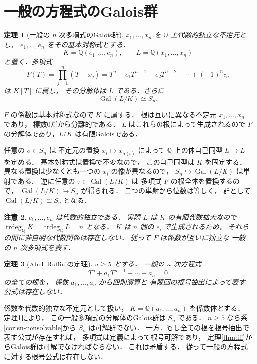 \documentclass[a5paper,10pt,onecolumn]{jsarticle}
\makeatletter
\theoremstyle{mathnotetheorem}
\newtheorem{theorem}{定理}[section]
\newtheorem{remark}[theorem]{注意}
\renewcommand{\proofname}{証明}
\renewenvironment{proof}[1][\proofname]{%
  \par\pushQED{\qed}\normalfont\topsep4\p@\@plus2\p@\relax
  \trivlist\item[\hskip\labelsep\bfseries #1]\ignorespaces
}{\popQED\endtrivlist\@endpefalse}
\makeatother
\begin{document}
\section{一般の方程式のGalois群}

\begin{theorem}[一般の $n$ 次多項式のGalois群]\label{thm:generic}
$x_1,\dots,x_n$ を $\mathbb Q$ 上代数的独立な不定元とし，
$e_1,\dots,e_n$ をその基本対称式とする．
\[
 K=\mathbb Q(e_1,\dots,e_n),\qquad
 L=\mathbb Q(x_1,\dots,x_n)
\]
と置く．多項式
\[
 F(T)=\prod_{j=1}^n(T-x_j)
 =T^n-e_1T^{n-1}+e_2T^{n-2}
 -\cdots+(-1)^ne_n
\]
は $K[T]$ に属し，
その分解体は $L$ である．さらに
\[
 \operatorname{Gal}(L/K)\cong S_n.
\]
\end{theorem}
\begin{proof}
$F$ の係数は基本対称式なので $K$ に属する．
根は互いに異なる不定元 $x_1,\dots,x_n$ であり，
標数0だから分離的である．
$L$ はこれらの根によって生成されるので
$F$ の分解体であり，$L/K$ は有限Galoisである．

任意の $\sigma\in S_n$ は
不定元の置換
$x_i\mapsto x_{\sigma(i)}$ によって
$\mathbb Q$ 上の体自己同型 $L\to L$ を定める．
基本対称式は置換で不変なので，
この自己同型は $K$ を固定する．
異なる置換は少なくとも一つの $x_i$ の像が異なるので，
$S_n\hookrightarrow\operatorname{Gal}(L/K)$ は単射である．
逆に任意の $\tau\in\operatorname{Gal}(L/K)$ は
多項式 $F$ の根全体を置換するので，
$\operatorname{Gal}(L/K)\hookrightarrow S_n$ が得られる．
二つの単射から位数は等しく，
群として $\operatorname{Gal}(L/K)\cong S_n$ となる．
\end{proof}

\begin{remark}
$e_1,\dots,e_n$ は代数的独立である．
実際 $L$ は $K$ の有限代数拡大なので
$\operatorname{trdeg}_{\mathbb Q}K
=\operatorname{trdeg}_{\mathbb Q}L=n$ となる．
$K$ は $n$ 個の $e_i$ で生成されるため，
それらの間に非自明な代数関係は存在しない．
従って $F$ は係数が互いに独立な
\emph{一般の $n$ 次多項式}を表す．
\end{remark}

\begin{theorem}[Abel--Ruffiniの定理]\label{thm:abel-ruffini}
$n\ge5$ とする．
一般の $n$ 次方程式
\[
 T^n+a_1T^{n-1}+\cdots+a_n=0
\]
の全ての根を，
係数 $a_1,\dots,a_n$ から四則演算と
有限回の根号抽出によって表す公式は存在しない．
\end{theorem}
\begin{proof}
係数を代数的独立な不定元として扱い，
$K=\mathbb Q(a_1,\dots,a_n)$ を係数体とする．
定理\ref{thm:generic}により，
この一般多項式の分解体のGalois群は $S_n$ である．
$n\ge5$ なら系\ref{cor:sn-nonsolvable}から
$S_n$ は可解群でない．
一方，もし全ての根を根号抽出で表す公式が存在すれば，
多項式は定義によって根号可解であり，
定理\ref{thm:iff}からGalois群は可解でなければならない．
これは矛盾する．
従って一般の方程式に対する根号公式は存在しない．
\end{proof}
\end{document}
